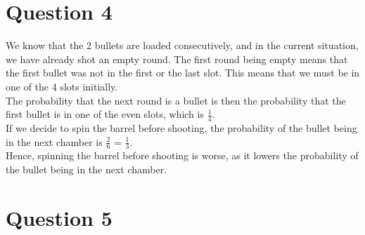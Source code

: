 \documentclass[a4paper]{article}
\begin{document}
\newpage

\section*{Question 4}

We know that the 2 bullets are loaded consecutively, and in the current situation, we have already shot an empty round. The first round being empty means that the first bullet was not in the first or the last slot. This means that we must be in one of the 4 slots initially. \\

The probability that the next round is a bullet is then the probability that the first bullet is in one of the even slots, which is $\frac{1}{4}$. \\

If we decide to spin the barrel before shooting, the probability of the bullet being in the next chamber is $\frac{2}{6}$ = $\frac{1}{3}$. \\

Hence, spinning the barrel before shooting is worse, as it lowers the probability of the bullet being in the next chamber.


\vspace{10mm}

\section*{Question 5}
\end{document}

